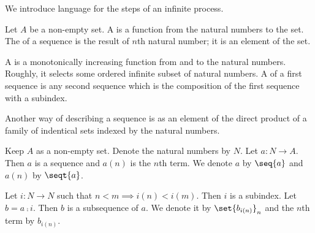 

We introduce language
for the steps of an
infinite process.


Let $A$ be a non-empty
set.
A 
is a function
from the natural numbers to the
set.
The  of a sequence
is the result of $n$th natural
number; it is an element of
the set.

A  is a monotonically
increasing function from and to the
natural numbers.
Roughly,
it
selects some ordered infinite
subset of natural numbers.
A  of a first
sequence is any second sequence
which is the composition of the
first sequence with a subindex.


Another way of describing a sequence
is as an element of the direct product
of a family of indentical sets indexed
by the natural numbers.


Keep $A$ as a non-empty set.
Denote the natural numbers by $N$.
Let $a: N \to A$.
Then $a$ is a sequence and
$a(n)$ is the $n$th term.
We denote $a$ by
$\seq{a}$ and $a(n)$ by $\seqt{a}$.

Let $i: N \to N$ such that
$n < m \implies i(n) < i(m)$.
Then $i$ is a subindex.
Let $b = a \comp i$.
Then $b$ is a subsequence of $a$.
We denote it by
$\set{b_{i(n)}}_n$ and the $n$th
term by $b_{i(n)}$.
